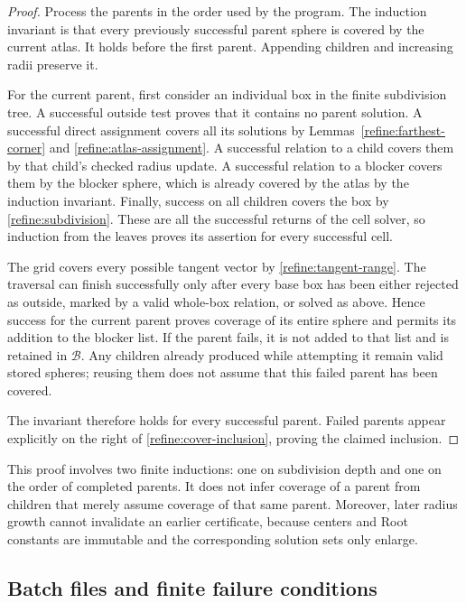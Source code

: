 \begin{proof}
Process the parents in the order used by the program.  The induction
invariant is that every previously successful parent sphere is covered
by the current atlas.  It holds before the first parent.  Appending
children and increasing radii preserve it.

For the current parent, first consider an individual box in the finite
subdivision tree.  A successful outside test proves that it contains
no parent solution.  A successful direct assignment covers all its
solutions by Lemmas~\ref{refine:farthest-corner} and
\ref{refine:atlas-assignment}.  A successful relation to a child covers
them by that child's checked radius update.  A successful relation to
a blocker covers them by the blocker sphere, which is already covered
by the atlas by the induction invariant.  Finally, success on all
children covers the box by \eqref{refine:subdivision}.  These are all
the successful returns of the cell solver, so induction from the
leaves proves its assertion for every successful cell.

The grid covers every possible tangent vector by
\eqref{refine:tangent-range}.  The traversal can finish successfully
only after every base box has been either rejected as outside, marked
by a valid whole-box relation, or solved as above.  Hence success for
the current parent proves coverage of its entire sphere and permits
its addition to the blocker list.  If the parent fails, it is not added
to that list and is retained in $\mathcal B$.  Any children already
produced while attempting it remain valid stored spheres; reusing them
does not assume that this failed parent has been covered.

The invariant therefore holds for every successful parent.  Failed
parents appear explicitly on the right of
\eqref{refine:cover-inclusion}, proving the claimed inclusion.
\end{proof}

This proof involves two finite inductions: one on subdivision depth and
one on the order of completed parents.  It does not infer coverage of a
parent from children that merely assume coverage of that same parent.
Moreover, later radius growth cannot invalidate an earlier certificate,
because centers and Root constants are immutable and the corresponding
solution sets only enlarge.

\subsection{Batch files and finite failure conditions}

